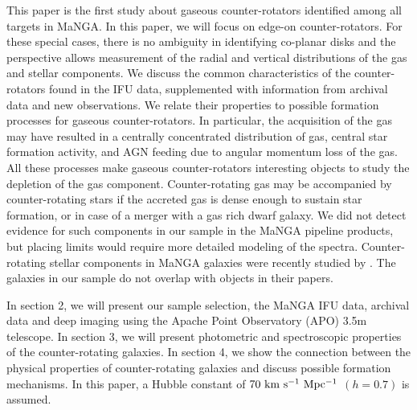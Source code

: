 \documentclass[fleqn,usenatbib]{mnras}
\begin{document}
This paper is the first study about gaseous counter-rotators 
identified among all targets in MaNGA. 
In this paper, we will focus on edge-on counter-rotators. 
For these special cases, there is no ambiguity in identifying 
co-planar disks and the perspective allows measurement of 
the radial and vertical distributions 
of the gas and stellar components.
We discuss the common characteristics of the counter-rotators 
found in the IFU data, supplemented with information 
from archival data and new observations. 
We relate their properties to possible 
formation processes for gaseous counter-rotators. In particular, the acquisition of the gas may have resulted in a centrally concentrated distribution of gas, central star formation activity, and AGN feeding due to angular momentum loss of the gas.
All these processes make gaseous counter-rotators interesting objects to study
the depletion of the gas component. 
Counter-rotating gas may be accompanied by counter-rotating stars if the accreted gas is dense enough to sustain star formation, or in case of a merger with a gas rich dwarf galaxy. We did not detect evidence for such components in our sample in the MaNGA pipeline products, but placing limits would require more detailed modeling of the spectra. Counter-rotating stellar components in MaNGA galaxies were recently studied by \citet{Becaxqua2022,Bao2022}. The galaxies in our sample do not overlap with objects in their papers.



In section 2, we will present our sample selection, the MaNGA IFU data, archival data and deep imaging using the Apache Point Observatory (APO) 3.5m telescope. 
In section 3, we will present photometric and spectroscopic properties of the counter-rotating galaxies. 
In section 4, we show the connection between the physical properties of counter-rotating galaxies and discuss possible formation mechanisms.
In this paper, a Hubble constant of $70\ \rm km~s^{-1}~Mpc^{-1}$ $(h=0.7)$ is assumed. 
\end{document}
